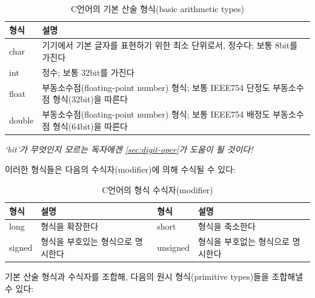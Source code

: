 \documentclass[a4paper,12pt]{book}
\begin{document}
\begin{table}[H]
    \centering

    \caption{C언어의 기본 산술 형식(basic arithmetic types)}
    \label{Tab:basic-arithmetic-types}

    \begin{tabular}{ || m{4em} | m{26em} || }
        \hline
        형식    & 설명 \\
        \hline\hline
        char   & 기기에서 기본 글자를 표현하기 위한 최소 단위로서, 정수다; 보통 8bit를 가진다 \\
        \hline
        int    & 정수; 보통 32bit를 가진다 \\
        \hline
        float  & 부동소수점(floating-point number) 형식; 보통 IEEE754 단정도 부동소수점 형식(32bit)을 따른다 \\
        \hline
        double & 부동소수점(floating-point number) 형식; 보통 IEEE754 배정도 부동소수점 형식(64bit)을 따른다 \\
        \hline
    \end{tabular}
    \newline
    \textit{\color{gray} \small `bit'가 무엇인지 모르는 독자에겐
    \autoref{sec:digit-oper}가 도움이 될 것이다!}
\end{table}

이러한 형식들은 다음의 수식자(modifier)에 의해 수식될 수 있다:

\begin{table}[H]
    \centering

    \caption{C언어의 형식 수식자(modifier)}
    \label{Tab:type-modifier}

    \begin{tabular}{ || m{4em} | m{9.9em} || m{4em} | m{9.9em} || }
        \hline
        형식 & 설명 & 형식 & 설명\\
        \hline\hline
        long & 형식을 확장한다 & short & 형식을 축소한다 \\
        \hline
        signed & 형식을 부호있는 형식으로 명시한다 & unsigned & 형식을 부호없는 형식으로 명시한다 \\
        \hline
    \end{tabular}
\end{table}

기본 산술 형식과 수식자를 조합해, 다음의 원시 형식(primitive types)들을 조합해낼 수 있다:
\end{document}
